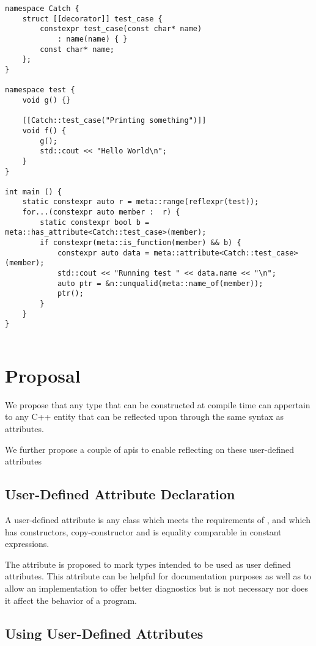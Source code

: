 \documentclass{wg21}
\begin{document}
\begin{verbatim}
namespace Catch {
    struct [[decorator]] test_case {
        constexpr test_case(const char* name)
            : name(name) { }
        const char* name;
    };
}

namespace test {
    void g() {}

    [[Catch::test_case("Printing something")]]
    void f() {
        g();
        std::cout << "Hello World\n";
    }
}

int main () {
    static constexpr auto r = meta::range(reflexpr(test));
    for...(constexpr auto member :  r) {
        static constexpr bool b = meta::has_attribute<Catch::test_case>(member);
        if constexpr(meta::is_function(member) && b) {
            constexpr auto data = meta::attribute<Catch::test_case>(member);
            std::cout << "Running test " << data.name << "\n";
            auto ptr = &n::unqualid(meta::name_of(member));
            ptr();
        }
    }
}


\end{verbatim}

\section{Proposal}

We propose that any  type that can be constructed at compile time can appertain to any C++ entity that can be reflected upon through the same syntax as attributes.

We further propose a couple of apis to enable reflecting on these user-defined attributes

\subsection{User-Defined Attribute Declaration}

A user-defined attribute is any class which meets the requirements of , and which has 
constructors, copy-constructor and is equality comparable in constant expressions.

The \tcode{[[decorator]]} attribute is proposed to mark types intended to be used as user defined attributes.
This attribute can be helpful for documentation purposes as well as to allow an implementation to offer better diagnostics but is not necessary nor does it affect the behavior of a program.

\subsection{Using User-Defined Attributes}
\end{document}

